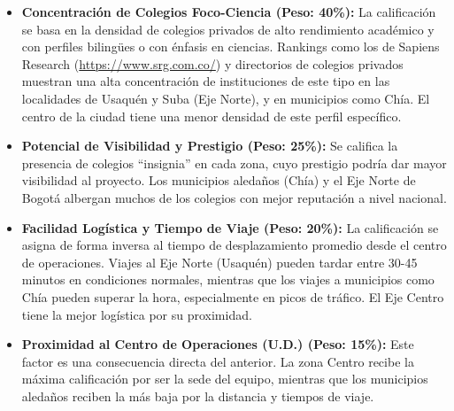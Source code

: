 \begin{itemize}
    \item \textbf{Concentración de Colegios Foco-Ciencia (Peso: 40\%):} La calificación se basa en la densidad de colegios privados de alto rendimiento académico y con perfiles bilingües o con énfasis en ciencias. Rankings como los de Sapiens Research (\url{https://www.srg.com.co/}) y directorios de colegios privados muestran una alta concentración de instituciones de este tipo en las localidades de Usaquén y Suba (Eje Norte), y en municipios como Chía. El centro de la ciudad tiene una menor densidad de este perfil específico.
    
    \item \textbf{Potencial de Visibilidad y Prestigio (Peso: 25\%):} Se califica la presencia de colegios ``insignia'' en cada zona, cuyo prestigio podría dar mayor visibilidad al proyecto. Los municipios aledaños (Chía) y el Eje Norte de Bogotá albergan muchos de los colegios con mejor reputación a nivel nacional.
    
    \item \textbf{Facilidad Logística y Tiempo de Viaje (Peso: 20\%):} La calificación se asigna de forma inversa al tiempo de desplazamiento promedio desde el centro de operaciones. Viajes al Eje Norte (Usaquén) pueden tardar entre 30-45 minutos en condiciones normales, mientras que los viajes a municipios como Chía pueden superar la hora, especialmente en picos de tráfico. El Eje Centro tiene la mejor logística por su proximidad.
    
    \item \textbf{Proximidad al Centro de Operaciones (U.D.) (Peso: 15\%):} Este factor es una consecuencia directa del anterior. La zona Centro recibe la máxima calificación por ser la sede del equipo, mientras que los municipios aledaños reciben la más baja por la distancia y tiempos de viaje.
\end{itemize}


